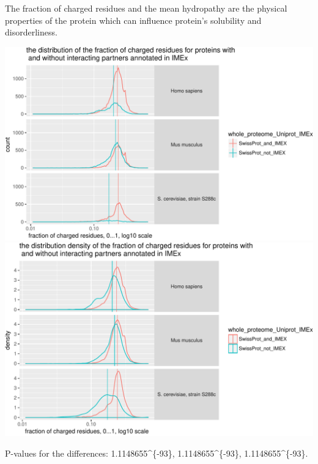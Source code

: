 \documentclass[]{article}
\begin{document}
The fraction of charged residues and the mean hydropathy are the
physical properties of the protein which can influence protein's
solubility and disorderliness.

\includegraphics{final_report_files/figure-latex/physical_properties_plot_FCR-1.pdf}
\includegraphics{final_report_files/figure-latex/physical_properties_plot_FCR-2.pdf}

P-values for the differences: 1.1148655\^{}\{-93\},
1.1148655\^{}\{-93\}, 1.1148655\^{}\{-93\}.
\end{document}
